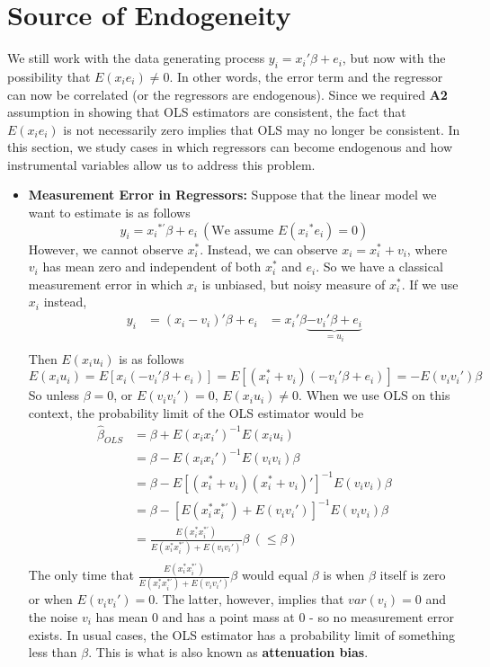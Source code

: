 \section{Source of Endogeneity}
We still work with the data generating process $y_i = x_i'\beta+e_i$, but now with the possibility that $E(x_ie_i)\neq0$. In other words, the error term and the regressor can now be correlated (or the regressors are endogenous). Since we required \textbf{A2} assumption in showing that OLS estimators are consistent, the fact that $E(x_ie_i)$ is not necessarily zero implies that OLS may no longer be consistent. In this section, we study cases in which regressors can become endogenous and how instrumental variables allow us to address this problem. 
\begin{itemize}
\item \textbf{Measurement Error in Regressors: }  Suppose that the linear model we want to estimate is as follows
\[
y_i = {x_i}^{*'}\beta+e_i \ (\text{We assume }E({x_i}^{*}e_i)=0)
\]
However, we cannot observe $x_i^*$. Instead, we can observe $x_i=x_i^*+v_i$, where $v_i$ has mean zero and independent of both $x_i^*$ and $e_i$. So we have a classical measurement error in which $x_i$ is unbiased, but noisy measure of $x_i^*$. If we use $x_i$ instead, 
\[
\begin{aligned}
y_i &= (x_i-v_i)'\beta+e_i &=x_i'\beta \underbrace{-v_i'\beta+e_i}_{=u_i} \\
\end{aligned}
\]
Then $E(x_iu_i)$ is as follows
\[
E(x_iu_i)=E[x_i(-v_i'\beta+e_i)]=E[(x_i^{*}+v_i)(-v_i'\beta+e_i)]=-E(v_iv_i')\beta
\]
So unless $\beta=0$, or $E(v_iv_i')=0$, $E(x_iu_i)\neq0$.  When we use OLS on this context, the probability limit of the OLS estimator would be
\[
\begin{aligned}
\hat{\beta}_{OLS} &=\beta+E(x_ix_i')^{-1}E(x_iu_i)\\
&=\beta-E(x_ix_i')^{-1}E(v_iv_i)\beta\\
&=\beta-E[(x_i^*+v_i)(x_i^*+v_i)']^{-1}E(v_iv_i)\beta\\
&=\beta-[E(x_i^*x_i^{*'})+E(v_iv_i')]^{-1}E(v_iv_i)\beta\\
&=\frac{E(x_i^*x_i^{*'})}{E(x_i^*x_i^{*'})+E(v_iv_i')}\beta \ (\leq\beta)\\
\end{aligned}
\]
The only time that $\frac{E(x_i^*x_i^{*'})}{E(x_i^*x_i^{*'})+E(v_iv_i')}\beta$ would equal $\beta$ is when $\beta$ itself is zero or when $E(v_iv_i')=0$. The latter, however, implies that $var(v_i)=0$ and the noise $v_i$ has mean 0 and has a point mass at 0 - so no measurement error exists. In usual cases, the OLS estimator has a probability limit of something less than $\beta$.  This is what is also known as \textbf{attenuation bias}. 

\end{itemize}
